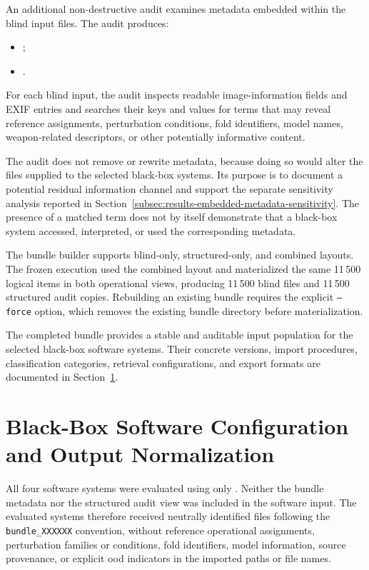 An additional non-destructive audit examines metadata embedded within the blind
input files. The audit produces:

\begin{itemize}
\item
{};

\item
{}.
\end{itemize}

For each blind input, the audit inspects readable image-information fields and
EXIF entries and searches their keys and values for terms that may reveal
reference assignments, perturbation conditions, fold identifiers, model names,
weapon-related descriptors, or other potentially informative content.

The audit does not remove or rewrite metadata, because doing so would alter the
files supplied to the selected black-box systems. Its purpose is to document a
potential residual information channel and support the separate sensitivity
analysis reported in
Section~\ref{subsec:results-embedded-metadata-sensitivity}. The presence of a
matched term does not by itself demonstrate that a black-box system accessed,
interpreted, or used the corresponding metadata.

The bundle builder supports blind-only, structured-only, and combined layouts.
The frozen execution used the combined layout and materialized the same 11\,500
logical items in both operational views, producing 11\,500 blind files and
11\,500 structured audit copies. Rebuilding an existing bundle requires the
explicit \texttt{--force} option, which removes the existing bundle directory
before materialization.

The completed bundle provides a stable and auditable input population for the
selected black-box software systems. Their concrete versions, import
procedures, classification categories, retrieval configurations, and export
formats are documented in
Section~\ref{sec:implementation-forensic-tools}.


\section{Black-Box Software Configuration and Output Normalization}
\label{sec:implementation-forensic-tools}
All four software systems were evaluated using only
.
Neither the bundle metadata nor the structured audit view was included in the
software input. The evaluated systems therefore received neutrally identified
files following the \texttt{bundle\_XXXXXX} convention, without reference
operational assignments, perturbation families or conditions, fold
identifiers, model information, source provenance, or explicit
\gls{ood} indicators in the imported paths or file names.

